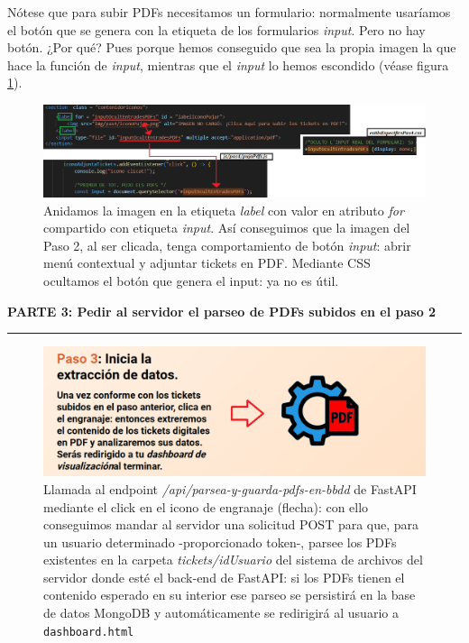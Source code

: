 \documentclass[a4paper,12pt]{report}
\begin{document}
	Nótese que para subir PDFs necesitamos un formulario: normalmente usaríamos el botón que se genera con la etiqueta de los formularios \textit{input}. Pero no hay botón. ¿Por qué? Pues porque hemos conseguido que sea la propia imagen la que hace la función de \textit{input}, mientras que el \textit{input} lo hemos escondido (véase figura \ref{fig:pujarTicketsAuxiliarLabelHTML}).
	
	
	\begin{figure}[H]
		\centering
		\caption{Anidamos la imagen en la etiqueta \textit{label} con valor en atributo \textit{for} compartido con etiqueta \textit{input}. Así conseguimos que la imagen del Paso 2, al ser clicada, tenga comportamiento de botón \textit{input}: abrir menú contextual y adjuntar tickets en PDF. Mediante CSS ocultamos el botón que genera el input: ya no es útil.}
		\includegraphics[width=1\linewidth]{img/pujarTicketsAuxiliarLabelHTML}

		\label{fig:pujarTicketsAuxiliarLabelHTML}
	\end{figure}
	

			
	\noindent \textbf{PARTE 3: Pedir al servidor el parseo de PDFs subidos en el paso 2}
	\hrule
	\vspace{.5em}
	
	
	
	\begin{figure}[H]
		\centering
		\caption{Llamada al endpoint \textit{/api/parsea-y-guarda-pdfs-en-bbdd} de FastAPI mediante el click en el icono de engranaje (flecha): con ello conseguimos mandar al servidor una solicitud POST para que, para un usuario determinado -proporcionado token-, parsee los PDFs existentes en la carpeta \textit{tickets/idUsuario} del sistema de archivos del servidor donde esté el back-end de FastAPI: si los PDFs tienen el contenido esperado en su interior ese parseo se persistirá en la base de datos MongoDB y automáticamente se redirigirá al usuario a \texttt{dashboard.html}}
		\includegraphics[width=1\linewidth]{img/part3pas4engranatge}

		\label{fig:part3pas4engranatge}
	\end{figure}
	
\end{document}
